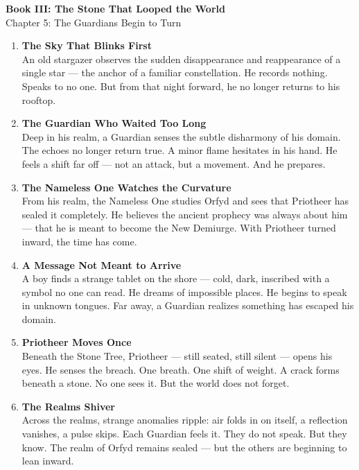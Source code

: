 \documentclass[9pt]{article}
\begin{document}
\begin{center}
    \Large\textbf{Book III: The Stone That Looped the World} \\
    \large Chapter 5: The Guardians Begin to Turn\\
\end{center}

\vspace{1in}

\begin{enumerate}
    \item \textbf{The Sky That Blinks First} \\
    An old stargazer observes the sudden disappearance and reappearance of a single star — the anchor of a familiar constellation. He records nothing. Speaks to no one. But from that night forward, he no longer returns to his rooftop.

    \vspace{1em}
    \item \textbf{The Guardian Who Waited Too Long} \\
    Deep in his realm, a Guardian senses the subtle disharmony of his domain. The echoes no longer return true. A minor flame hesitates in his hand. He feels a shift far off — not an attack, but a movement. And he prepares.

    \vspace{1em}
    \item \textbf{The Nameless One Watches the Curvature} \\
    From his realm, the Nameless One studies Orfyd and sees that Priotheer has sealed it completely. He believes the ancient prophecy was always about him — that he is meant to become the New Demiurge. With Priotheer turned inward, the time has come.

    \vspace{1em}
    \item \textbf{A Message Not Meant to Arrive} \\
    A boy finds a strange tablet on the shore — cold, dark, inscribed with a symbol no one can read. He dreams of impossible places. He begins to speak in unknown tongues. Far away, a Guardian realizes something has escaped his domain.

    \vspace{1em}
    \item \textbf{Priotheer Moves Once} \\
    Beneath the Stone Tree, Priotheer — still seated, still silent — opens his eyes. He senses the breach. One breath. One shift of weight. A crack forms beneath a stone. No one sees it. But the world does not forget.

    \vspace{1em}
    \item \textbf{The Realms Shiver} \\
    Across the realms, strange anomalies ripple: air folds in on itself, a reflection vanishes, a pulse skips. Each Guardian feels it. They do not speak. But they know. The realm of Orfyd remains sealed — but the others are beginning to lean inward.

\end{enumerate}
\end{document}
